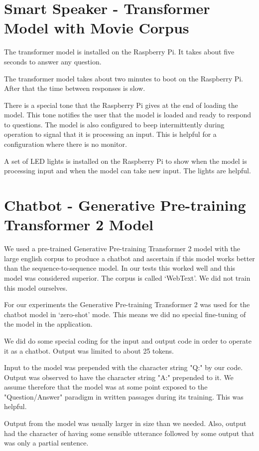 \section{Smart Speaker - Transformer Model with Movie Corpus}

The transformer model is installed on the Raspberry Pi. It takes about five seconds to answer any question.

The transformer model takes about two minutes to boot on the Raspberry Pi. After that the time between responses is slow. 

There is a special tone that the Raspberry Pi gives at the end of loading the model. This tone notifies the user that the model is loaded and ready to respond to questions. The model is also configured to beep intermittently during operation to signal that it is processing an input. This is helpful for a configuration where there is no monitor.

A set of LED lights is installed on the Raspberry Pi to show when the model is processing input and when the model can take new input. The lights are helpful.


\section{Chatbot - Generative Pre-training Transformer 2 Model}
We used a pre-trained Generative Pre-training Transformer 2 model with the large english corpus to produce a chatbot and ascertain if this model works better than the sequence-to-sequence model. In our tests this worked well and this model was considered superior. The corpus is called `WebText'. We did not train this model ourselves.

For our experiments the Generative Pre-training Transformer 2 was used for the chatbot model in `zero-shot' mode. This means we did no special fine-tuning of the model in the application.

We did do some special coding for the input and output code in order to operate it as a chatbot. Output was limited to about 25 tokens. 

Input to the model was prepended with the character string "Q:" by our code. Output was observed to have the character string "A:" prepended to it. We assume therefore that the model was at some point exposed to the "Question/Answer" paradigm in written passages during its training. This was helpful.

Output from the model was usually larger in size than we needed. Also, output had the character of having some sensible utterance followed by some output that was only a partial sentence.

